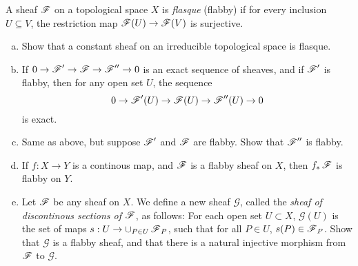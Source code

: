 \documentclass[11pt, english]{article}
\begin{document}
\begin{exc}
A sheaf $\operatorname{\mathscr{F}}$ on a topological space $X$ is \emph{flasque} (flabby) if for every inclusion $U \subseteq V$, the restriction map $\operatorname{\mathscr{F}}(U) \to \operatorname{\mathscr{F}}(V)$ is surjective.
\begin{enumerate}[a)]
\item Show that a constant sheaf on an irreducible topological space is flasque.
\item If $0 \to \operatorname{\mathscr{F}}' \to \operatorname{\mathscr{F}} \to \operatorname{\mathscr{F}}'' \to 0$ is an exact sequence of sheaves, and if $\operatorname{\mathscr{F}}'$ is flabby, then for any open set $U$, the sequence
$$
0 \to \operatorname{\mathscr{F}}'(U) \to \operatorname{\mathscr{F}}(U) \to \operatorname{\mathscr{F}}''(U) \to 0
$$
is exact.
\item Same as above, but suppose $\operatorname{\mathscr{F}}'$ and $\operatorname{\mathscr{F}}$ are flabby. Show that $\operatorname{\mathscr{F}}''$ is flabby.
\item If $f:X \to Y$ is a continous map, and $\operatorname{\mathscr{F}}$ is a flabby sheaf on $X$, then $f_*\operatorname{\mathscr{F}}$ is flabby on $Y$.
\item Let $\operatorname{\mathscr{F}}$ be any sheaf on $X$. We define a new sheaf $\mathscr G$, called the \emph{sheaf of discontinous sections of $\operatorname{\mathscr{F}}$}, as follows: For each open set $U \subset X$, $\mathscr G(U)$ is the set of maps $s:U \to \cup_{P \in U} \operatorname{\mathscr{F}}_P$, such that for all $P \in U$, $s(P) \in \operatorname{\mathscr{F}}_P$. Show that $\mathscr G$ is a flabby sheaf, and that there is a natural injective morphism from $\operatorname{\mathscr{F}}$ to $\mathscr G$.
\end{enumerate}
\end{exc}
\end{document}
